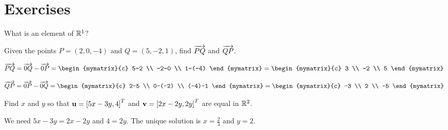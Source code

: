 \section*{Exercises}

\begin{ex}
  What is an element of $\mathbb{R}^1$?
\end{ex}

\begin{ex} Given the points $P=(2,0,-4)$ and $Q=(5,-2,1)$, find $\overrightarrow{PQ}$ and $\overrightarrow{QP}$.

  \begin{sol}

    \begin{equation*}
      \longvect{PQ}  = \longvect{0Q} - \longvect{0P}= \begin{mymatrix}{c}
        5-2 \\
        -2-0 \\
        1-(-4)
      \end{mymatrix} = \begin{mymatrix}{c}
        3 \\
        -2 \\
        5
      \end{mymatrix}
    \end{equation*}

    \begin{equation*}
      \longvect{QP}  = \longvect{0P} - \longvect{0Q}= \begin{mymatrix}{c}
        2-5 \\
        0-(-2) \\
        (-4)-1
      \end{mymatrix} = \begin{mymatrix}{c}
        -3 \\
        2 \\
        -5
      \end{mymatrix}
    \end{equation*}

  \end{sol}
\end{ex}

\begin{ex} Find $x$ and $y$ so that $\vect{u}= \mat{5x-3y, 4}^T$ and
  $\vect{v}=\mat{2x-2y, 2y}^T$ are equal in $\mathbb{R}^2$.

  \begin{sol}
    We need $5x-3y=2x-2y$ and $4=2y$. The unique solution is
    $x=\frac{2}{3}$ and $y=2$.
  \end{sol}
\end{ex}

